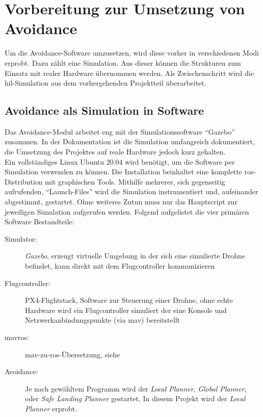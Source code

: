 \chapter{Vorbereitung zur Umsetzung von Avoidance}\label{chap:intro_avoidance}

Um die Avoidance-Software umzusetzen, wird diese vorher in verschiedenen Modi erprobt. Dazu zählt eine Simulation. Aus dieser können die Strukturen zum Einsatz mit realer Hardware übernommen werden. Als Zwischenschritt wird die \gls{hil}-Simulation aus dem vorhergehenden Projektteil überarbeitet.

\section{Avoidance als Simulation in Software}\label{chap:sim_gazebo}
Das Avoidance-Modul arbeitet eng mit der Simulationssoftware \enquote{Gazebo} zusammen. In der Dokumentation \cite{dronecodestiftungObstacleDetectionAvoidance2023} ist die Simulation umfangreich dokumentiert, die Umsetzung des Projektes auf reale Hardware jedoch kurz gehalten.\\
Ein vollständiges Linux Ubuntu 20.04 wird benötigt, um die Software per Simulation verwenden zu können. Die Installation beinhaltet eine komplette \acrshort{ros}-Distribution mit graphischen Tools. Mithilfe mehrerer, sich gegenseitig aufrufenden, \enquote{Launch-Files} wird die Simulation instrumentiert und, aufeinander abgestimmt, gestartet. Ohne weiteres Zutun muss nur das Hauptscript zur jeweiligen Simulation aufgerufen werden. Folgend aufgelistet die vier primären Software Bestandteile:
\begin{description}
    \item[Simulator:] \textit{Gazebo}, erzeugt virtuelle Umgebung in der sich eine simulierte Drohne befindet, kann direkt mit dem Flugcontroller kommunizieren
    \item[Flugcontroller:] PX4-Flightstack, Software zur Steuerung einer Drohne, ohne echte Hardware wird ein Flugcontroller simuliert der eine Konsole und Netzwerkanbindungspunkte (via \acrshort{mav}) bereitstellt
    \item[mavros:] \acrshort{mav}-zu-\acrshort{ros}-Übersetzung, siehe \cite[Kapitel 5.2]{markusreinErweiterungBestehenderDrohnen2023}
    \item[Avoidance:] Je nach gewähltem Programm wird der \textit{Local Planner}, \textit{Global Planner}, oder \textit{Safe Landing Planner} gestartet. In diesem Projekt wird der \textit{Local Planner} erprobt.
\end{description}
